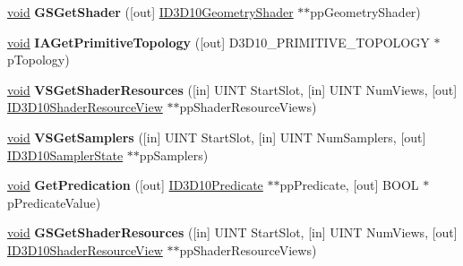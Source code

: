 \begin{DoxyCompactItemize}
\mbox{\label{interface_i_d3_d10_device_a09190f1fb8ef9fc53fa0fb3a513647fb}} 
\hyperlink{interfacevoid}{void} {\bfseries G\+S\+Get\+Shader} (\mbox{[}out\mbox{]} \hyperlink{interface_i_d3_d10_geometry_shader}{I\+D3\+D10\+Geometry\+Shader} $\ast$$\ast$pp\+Geometry\+Shader)
\item 
\mbox{\label{interface_i_d3_d10_device_a7f293b14ba635bb347899ad772f36c8f}} 
\hyperlink{interfacevoid}{void} {\bfseries I\+A\+Get\+Primitive\+Topology} (\mbox{[}out\mbox{]} D3\+D10\+\_\+\+P\+R\+I\+M\+I\+T\+I\+V\+E\+\_\+\+T\+O\+P\+O\+L\+O\+GY $\ast$p\+Topology)
\item 
\mbox{\label{interface_i_d3_d10_device_a5b69e18b274e8be9715779fa2d23a5f8}} 
\hyperlink{interfacevoid}{void} {\bfseries V\+S\+Get\+Shader\+Resources} (\mbox{[}in\mbox{]} U\+I\+NT Start\+Slot, \mbox{[}in\mbox{]} U\+I\+NT Num\+Views, \mbox{[}out\mbox{]} \hyperlink{interface_i_d3_d10_shader_resource_view}{I\+D3\+D10\+Shader\+Resource\+View} $\ast$$\ast$pp\+Shader\+Resource\+Views)
\item 
\mbox{\label{interface_i_d3_d10_device_a8b803f23348bc6a21230b454a21771da}} 
\hyperlink{interfacevoid}{void} {\bfseries V\+S\+Get\+Samplers} (\mbox{[}in\mbox{]} U\+I\+NT Start\+Slot, \mbox{[}in\mbox{]} U\+I\+NT Num\+Samplers, \mbox{[}out\mbox{]} \hyperlink{interface_i_d3_d10_sampler_state}{I\+D3\+D10\+Sampler\+State} $\ast$$\ast$pp\+Samplers)
\item 
\mbox{\label{interface_i_d3_d10_device_af87ff5cf8842e815fc9080aa67e2e41d}} 
\hyperlink{interfacevoid}{void} {\bfseries Get\+Predication} (\mbox{[}out\mbox{]} \hyperlink{interface_i_d3_d10_predicate}{I\+D3\+D10\+Predicate} $\ast$$\ast$pp\+Predicate, \mbox{[}out\mbox{]} B\+O\+OL $\ast$p\+Predicate\+Value)
\item 
\mbox{\label{interface_i_d3_d10_device_af9ffff3ea3f70c7f2d62b8aac97f1aa5}} 
\hyperlink{interfacevoid}{void} {\bfseries G\+S\+Get\+Shader\+Resources} (\mbox{[}in\mbox{]} U\+I\+NT Start\+Slot, \mbox{[}in\mbox{]} U\+I\+NT Num\+Views, \mbox{[}out\mbox{]} \hyperlink{interface_i_d3_d10_shader_resource_view}{I\+D3\+D10\+Shader\+Resource\+View} $\ast$$\ast$pp\+Shader\+Resource\+Views)
$$
\end{DoxyCompactItemize}
